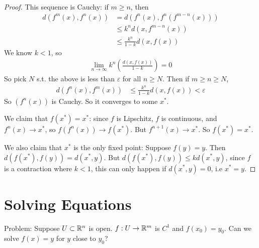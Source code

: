 \documentclass[a4paper]{article}
\begin{document}
\begin{thm}
\begin{proof}
This sequence is Cauchy: if $m \geq n$, then 
\begin{equation*}
\begin{aligned}
d\left(f^m\left(x\right),f^n\left(x\right)\right) &= d\left(f^n\left(x\right),f^n\left(f^{m-n}\left(x\right)\right)\right)\\
&\leq k^n d\left(x,f^{m-n}\left(x\right)\right)\\
&\leq \frac{k^n}{1-k}d\left(x,f\left(x\right)\right)
\end{aligned}
\end{equation*}
We know $k<1$, so
\begin{equation*}
\begin{aligned}
\lim_{n \to \infty} k^n \left(\frac{d\left(x,f\left(x\right)\right)}{1-k}\right) = 0
\end{aligned}
\end{equation*}
So pick $N$ s.t. the above is less than $\varepsilon$ for all $n \geq N$. Then if $m \geq n \geq N$,
\begin{equation*}
\begin{aligned}
d\left(f^n\left(x\right),f^m\left(x\right)\right) &\leq \frac{k^n}{1-k}d\left(x,f\left(x\right)\right) < \varepsilon
\end{aligned}
\end{equation*}
So $\left(f^n\left(x\right)\right)$ is Cauchy. So it converges to some $x^*$.

We claim that $f\left(x^*\right) = x^*$: since $f$ is Lipschitz, $f$ is continuous, and $f^n\left(x\right) \to x^*$, so $f\left(f^n\left(x\right)\right) \to f\left(x^*\right)$. But $f^{n+1}\left(x\right) \to x^*$. So $f\left(x^*\right) = x^*$.

We also claim that $x^*$ is the only fixed point: Suppose $f\left(y\right) = y$. Then $d\left(f\left(x^*\right),f\left(y\right)\right) = d\left(x^*,y\right)$. But $d\left(f\left(x^*\right),f\left(y\right)\right) \leq k d\left(x^*,y\right)$, since $f$ is a contraction where $k<1$, this can only happen if $d\left(x^*,y\right) =0 $, i.e $x^* = y$.
\end{proof}
\end{thm}

\newpage

\section{Solving Equations}
Problem: Suppose $U \subset \mathbb{R}^n$ is open. $f:U \to \mathbb{R}^m$ is $C^1$ and $f(x_0)=y_0$. Can we solve $f(x)=y$ for $y$ close to $y_0$?
\end{document}
